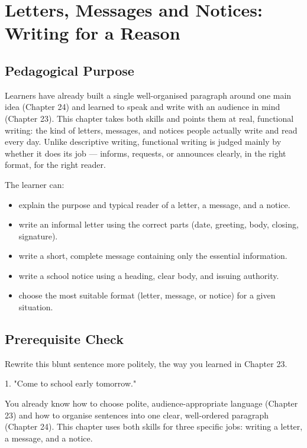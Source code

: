 
\chapter{Letters, Messages and Notices: Writing for a Reason}

\section{Pedagogical Purpose}
Learners have already built a single well-organised paragraph around one main idea (Chapter 24) and learned to speak and write with an audience in mind (Chapter 23). This chapter takes both skills and points them at real, functional writing: the kind of letters, messages, and notices people actually write and read every day. Unlike descriptive writing, functional writing is judged mainly by whether it does its job — informs, requests, or announces clearly, in the right format, for the right reader.

\begin{learningobjectives}
The learner can:
\begin{itemize}
    \item explain the purpose and typical reader of a letter, a message, and a notice.
    \item write an informal letter using the correct parts (date, greeting, body, closing, signature).
    \item write a short, complete message containing only the essential information.
    \item write a school notice using a heading, clear body, and issuing authority.
    \item choose the most suitable format (letter, message, or notice) for a given situation.
\end{itemize}
\end{learningobjectives}

\section{Prerequisite Check}
\begin{quickcheck}
Rewrite this blunt sentence more politely, the way you learned in Chapter 23.

1. "Come to school early tomorrow."
\end{quickcheck}

\begin{rememberbox}
You already know how to choose polite, audience-appropriate language (Chapter 23) and how to organise sentences into one clear, well-ordered paragraph (Chapter 24). This chapter uses both skills for three specific jobs: writing a letter, a message, and a notice.
\end{rememberbox}

